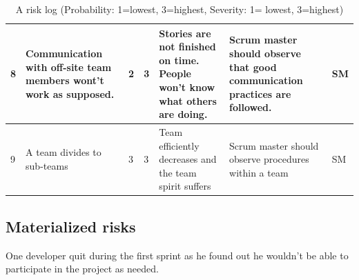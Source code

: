 \begin{table}[H]
{\begin{tabular}{|p{0.5cm}|p{3cm}|p{1cm}|p{1.5cm}|p{4cm}|p{4cm}|p{1cm}|}
8 &
Communication with off-site team members wont't work as supposed. &
2 &
3 &
Stories are not finished on time. People won't know what others are doing. &
Scrum master should observe that good communication practices are followed. &
SM 
\\
\hline

9 &
A team divides to sub-teams &
3 &
3 &
Team efficiently decreases and the team spirit suffers &
Scrum master should observe procedures within a team &
SM
\\
\hline

\end{tabular} 
}
\caption{A risk log (Probability: 1=lowest, 3=highest, Severity: 1= lowest, 
3=highest)}
\label{table:Risklog}
\end{table}

\subsection{Materialized risks}

One developer quit during the first sprint as he found out he wouldn't be able
to participate in the project as needed.

